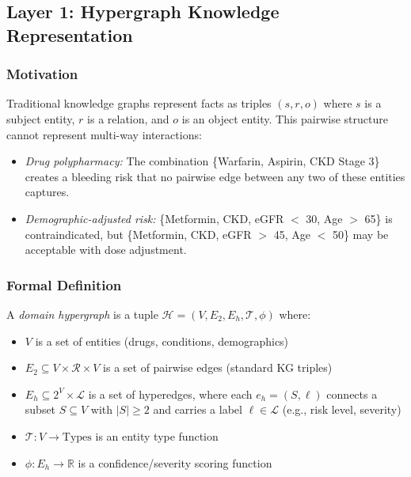 \documentclass[11pt,a4paper]{article}
\begin{document}
\subsection{Layer 1: Hypergraph Knowledge Representation}
\label{sec:hypergraph}

\subsubsection{Motivation}

Traditional knowledge graphs represent facts as triples $(s, r, o)$ where $s$ is a subject entity, $r$ is a relation, and $o$ is an object entity. This pairwise structure cannot represent multi-way interactions:

\begin{itemize}[noitemsep]
    \item \textit{Drug polypharmacy:} The combination \{Warfarin, Aspirin, CKD Stage 3\} creates a bleeding risk that no pairwise edge between any two of these entities captures.
    \item \textit{Demographic-adjusted risk:} \{Metformin, CKD, eGFR $<$ 30, Age $>$ 65\} is contraindicated, but \{Metformin, CKD, eGFR $>$ 45, Age $<$ 50\} may be acceptable with dose adjustment.
\end{itemize}

\subsubsection{Formal Definition}

A \textit{domain hypergraph} is a tuple $\mathcal{H} = (V, E_2, E_h, \mathcal{T}, \phi)$ where:
\begin{itemize}[noitemsep]
    \item $V$ is a set of entities (drugs, conditions, demographics)
    \item $E_2 \subseteq V \times \mathcal{R} \times V$ is a set of pairwise edges (standard KG triples)
    \item $E_h \subseteq 2^V \times \mathcal{L}$ is a set of hyperedges, where each $e_h = (S, \ell)$ connects a subset $S \subseteq V$ with $|S| \geq 2$ and carries a label $\ell \in \mathcal{L}$ (e.g., risk level, severity)
    \item $\mathcal{T}: V \rightarrow \text{Types}$ is an entity type function
    \item $\phi: E_h \rightarrow \mathbb{R}$ is a confidence/severity scoring function
\end{itemize}
\end{document}
